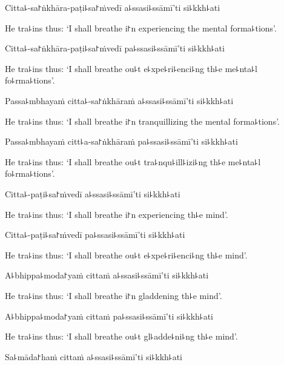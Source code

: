 Citta꜕-sa꜓ṅkhāra-paṭi꜕sa꜓ṁvedī a꜕ssasi꜕ssāmī'ti si꜕kkh꜕ati

\begin{english}
  He tra꜕ins thus: `I shall breathe i꜓n experiencing the mental forma꜕tions'.
\end{english}

Citta꜕-sa꜓ṅkhāra-paṭi꜕sa꜓ṁvedī pa꜕ssasi꜕ssāmī'ti si꜕kkh꜕ati

\begin{english}
  He tra꜕ins thus: `I shall breathe ou꜕t e꜕xpe꜕ri꜕enci꜕ng th꜕e me꜕nta꜕l fo꜕rma꜕tions'.
\end{english}

Passa꜕mbhayaṁ citta꜕-sa꜓ṅkhāraṁ a꜕ssasi꜕ssāmī'ti si꜕kkh꜕ati

\begin{english}
  He tra꜕ins thus: `I shall breathe i꜓n tranquillizing the mental forma꜕tions'.
\end{english}

Passa꜕mbhayaṁ citt꜕a-sa꜓ṅkhāraṁ pa꜕ssasi꜕ssāmī'ti si꜕kkh꜕ati

\begin{english}
  He tra꜕ins thus: `I shall breathe ou꜕t tra꜕nqu꜕ill꜕izi꜕ng th꜕e me꜕nta꜕l fo꜕rma꜕tions'.
\end{english}

Citta꜕-paṭi꜕sa꜓ṁvedī a꜕ssasi꜕ssāmī'ti si꜕kkh꜕ati

\begin{english}
  He tra꜕ins thus: `I shall breathe i꜓n experiencing th꜕e mind'.
\end{english}

Citta꜕-paṭi꜕sa꜓ṁvedī pa꜕ssasi꜕ssāmī'ti si꜕kkh꜕ati

\begin{english}
  He tra꜕ins thus: `I shall breathe ou꜕t e꜕xpe꜕ri꜕enci꜕ng th꜕e mind'.
\end{english}

A꜕bhippa꜕moda꜓yaṁ cittaṁ a꜕ssasi꜕ssāmī'ti si꜕kkh꜕ati

\begin{english}
  He tra꜕ins thus: `I shall breathe i꜓n gladdening th꜕e mind'.
\end{english}

A꜕bhippa꜕moda꜓yaṁ cittaṁ pa꜕ssasi꜕ssāmī'ti si꜕kkh꜕ati

\begin{english}
  He tra꜕ins thus: `I shall breathe ou꜕t gl꜕adde꜕ni꜕ng th꜕e mind'.
\end{english}

Sa꜕māda꜓haṁ cittaṁ a꜕ssasi꜕ssāmī'ti si꜕kkh꜕ati

